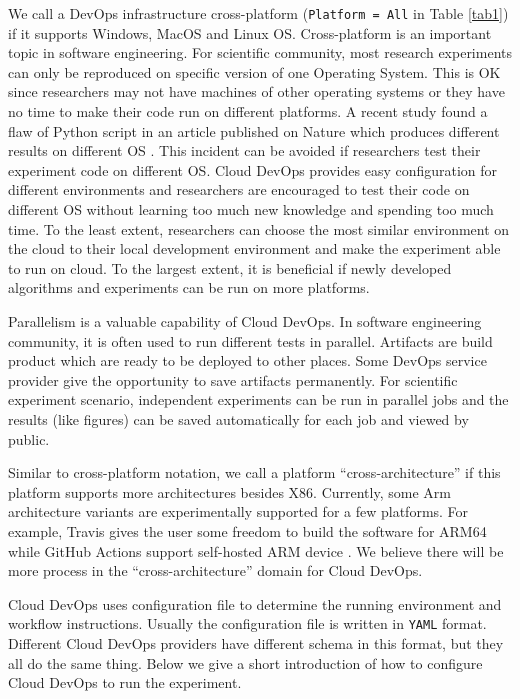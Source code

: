 \documentclass[10pt, conference, compsocconf]{IEEEtran}
\begin{document}
We call a DevOps infrastructure cross-platform (\texttt{Platform = All} in Table  \ref{tab1}) if it supports Windows, MacOS and Linux 
OS.
Cross-platform is an important topic in software engineering. For scientific community, most research experiments can only be reproduced on specific version of one Operating System. This is OK since researchers may not have machines of other operating systems or they have no time to make their code run on different platforms. A recent study found a flaw of Python script in an article published on Nature which produces different results on different OS \cite{bhandari2019characterization}. This incident can be avoided if researchers test their experiment code on different OS. Cloud DevOps provides easy configuration for different environments and researchers are encouraged to test their code on different OS without learning too much new knowledge and spending too much time. To the least extent, researchers can choose the most similar environment on the cloud to their local development environment and make the experiment able to run on cloud. To the largest extent, it is beneficial if newly developed algorithms and experiments can be run on more platforms.

Parallelism is a valuable capability of Cloud DevOps. In software engineering community, it is often used to run different tests in parallel.
Artifacts are build product which are ready to be deployed to other places.
Some DevOps service provider give the opportunity to save artifacts permanently. For scientific experiment scenario, independent experiments can be run in parallel jobs and the results (like figures) can be saved automatically for each job and viewed by public.

Similar to cross-platform notation, we call a platform ``cross-architecture'' if this platform supports more architectures besides X86. Currently, some Arm architecture variants are experimentally supported for a few platforms. For example, Travis gives the user some freedom to build the software
for ARM64 while GitHub Actions support self-hosted ARM device \cite{travis-arm, github-selfhosted}. We believe there will be more process in the ``cross-architecture'' domain for Cloud DevOps. 

Cloud DevOps uses configuration file to determine the running environment and workflow instructions. 
Usually the configuration file is written in \texttt{YAML} format. Different Cloud DevOps providers have different schema in this format, but they all do the same thing. Below we give a short introduction of how to configure Cloud DevOps to run the experiment.
\end{document}
